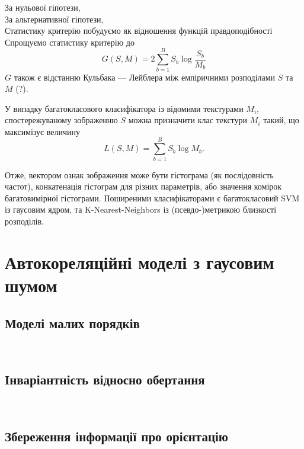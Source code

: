 За нульової гіпотези, \todo{} \\
За альтернативної гіпотези, \todo{} \\
Статистику критерію побудуємо як відношення функцій правдоподібності \todo{}  \\
Спрощуємо статистику критерію до 
\begin{equation}\label{e:classify-1}
    G(S,M) = 2\sum_{b=1}^B S_b \log \frac{S_b}{M_b}
\end{equation}
$G$ також є відстанню Кульбака — Лейблера між емпіричними розподілами $S$ та $M$ (?). \\

У випадку багатокласового класифікатора із відомими текстурами $M_i$, спостережуваному зображенню $S$ можна призначити клас текстури $M_i$ такий,
що максимізує величину
\begin{equation}\label{e:classify-2}
    L(S,M) = \sum_{b=1}^B S_b \log M_b.
\end{equation}

\todo{}

Отже, вектором ознак зображення може бути гістограма (як послідовність частот), конкатенація гістограм для різних параметрів, або значення комірок багатовимірної гістограми.
Поширеними класифікаторами є багатокласовий SVM із гаусовим ядром, та K-Nearest-Neighbors із \mbox{(псевдо-)метрикою} близкості розподілів.


\section{Автокореляційні моделі з гаусовим шумом}\label{section1.2}

\subsection{Моделі малих порядків}\label{section1.2.a}
\hfill\\ 


\subsection{Інваріантність відносно обертання}\label{section1.2.b}
\hfill\\ 


\subsection{Збереження інформації про орієнтацію}\label{section1.2.с}
\hfill\\ 


